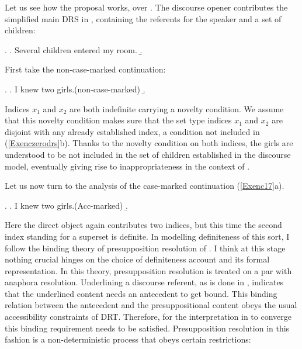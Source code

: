 \documentclass[11pt,a4paper]{article}
\begin{document}
Let us see how the proposal works, over . The discourse opener  contributes the simplified main DRS in , containing the referents for the speaker and a set of children:

\ex.\label{Exencmaindrs}
\a. Several children entered my room.
\b. 

First take the non-case-marked continuation:

\ex.\label{Exenczerodrs}
\a. I knew two girls.\hfill (non-case-marked)
\b.

Indices $x_1$ and $x_2$ are both indefinite carrying a novelty condition. We assume that this novelty condition makes sure that the set type indices $x_1$ and $x_2$ are disjoint with any already established index, a condition not included in (\ref{Exenczerodrs}b).  Thanks to the novelty condition on both indices, the girls are understood to be not included in the set of children established in the discourse model, eventually giving rise to inappropriateness in the context of .

Let us now turn to the analysis of the case-marked continuation (\ref{Exenc17}{a}).

\ex.\label{Exencacc1}
\a. I knew two girls.\hfill (Acc-marked)
\b. 

Here the direct object  again contributes two indices, but this time the second index standing for a superset is definite. In modelling definiteness of this sort, I follow the binding theory of presupposition resolution of . I think at this stage nothing crucial hinges on the choice of definiteness account and its formal representation. In this theory, presupposition resolution is treated on a par with anaphora resolution. Underlining a discourse referent, as is done in , indicates that the underlined content needs an antecedent to get bound. This binding relation between the antecedent and the presuppositional content obeys the usual accessibility constraints of DRT. Therefore, for the interpretation in  to converge this binding requirement needs to be satisfied. Presupposition resolution in this fashion is a non-deterministic process that obeys certain restrictions:
\end{document}
